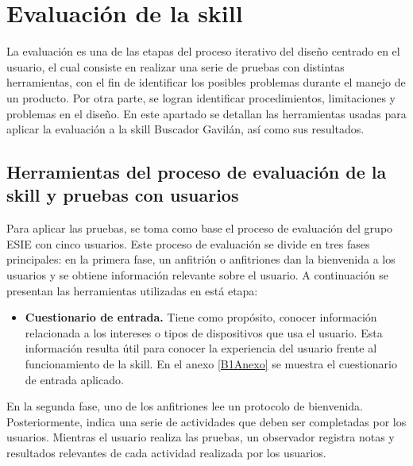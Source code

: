 
\section{Evaluación de la skill}
\label{EvaluacionSkillcapIV}

La evaluación es una de las etapas del proceso iterativo del diseño centrado en el usuario, el cual consiste en realizar una serie de pruebas con distintas herramientas, con el fin de identificar los posibles problemas durante el manejo de un producto. Por otra parte, se logran identificar procedimientos, limitaciones y problemas en el diseño. En este apartado se detallan las herramientas usadas para aplicar la evaluación a la skill Buscador Gavilán, así como sus resultados.


\subsection{Herramientas del proceso de evaluación de la skill y pruebas con usuarios}
\label{HerramientasEvaluacionPruebasUsuarioscapIV}

Para aplicar las pruebas, se toma como base el proceso de evaluación del grupo ESIE con cinco usuarios. Este proceso de evaluación se divide en tres fases principales: en la primera fase, un anfitrión o anfitriones dan la bienvenida a los usuarios y se obtiene información relevante sobre el usuario. A continuación se presentan las herramientas utilizadas en está etapa:

\begin{itemize}
  \item \textbf{Cuestionario de entrada.} Tiene como propósito, conocer información relacionada a los intereses o tipos de dispositivos que usa el usuario. Esta información resulta útil para conocer la experiencia del usuario frente al funcionamiento de la skill. En el anexo \ref{B1Anexo} se muestra el cuestionario de entrada aplicado.
\end{itemize}

En la segunda fase, uno de los anfitriones lee un protocolo de bienvenida. Posteriormente, indica una serie de actividades que deben ser completadas por los usuarios. Mientras el usuario realiza las pruebas, un observador registra notas y resultados relevantes de cada actividad realizada por los usuarios.

